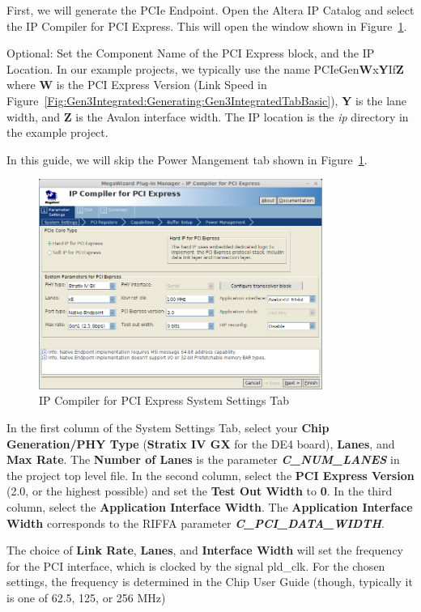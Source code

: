 \documentclass{refrep}
\newcommand{\Directory}[1]{\textit{#1}}
\newcommand{\ConfigSetting}[1]{\textbf{#1}}
\newcommand{\RIFFAParameter}[1]{\textit{\textbf{#1}}}
\begin{document}
First, we will generate the PCIe Endpoint. Open the Altera IP Catalog and select
the IP Compiler for PCI Express. This will open the window shown in
Figure~\ref{Fig:Altera:IPCompiler:PCIeSystemSettingsTab}.

Optional: Set the Component Name of the PCI Express block, and the IP
Location. In our example projects, we typically use the name
PCIeGen\ConfigSetting{W}x\ConfigSetting{Y}If\ConfigSetting{Z} where \ConfigSetting{W} is the PCI Express
Version (Link Speed in
Figure~\ref{Fig:Gen3Integrated:Generating:Gen3IntegratedTabBasic}), \ConfigSetting{Y}
is the lane width, and \ConfigSetting{Z} is the Avalon interface width. The IP location
is the \Directory{ip} directory in the example project.

In this guide, we will skip the Power Mangement tab shown in
Figure~\ref{Fig:Altera:IPCompiler:PCIeSystemSettingsTab}.
\begin{figure}[H]
  \includegraphics[width=350px,center]{IPCompilerPCIeTabSystemSettings.png}
  \caption{IP Compiler for PCI Express System Settings Tab}
  \label{Fig:Altera:IPCompiler:PCIeSystemSettingsTab}
\end{figure}
In the first column of the System Settings Tab, select your \ConfigSetting{Chip
  Generation/PHY Type} (\ConfigSetting{Stratix IV GX} for the DE4 board),
\ConfigSetting{Lanes}, and \ConfigSetting{Max Rate}. The \ConfigSetting{Number
  of Lanes} is the parameter \RIFFAParameter{C\_NUM\_LANES} in the project top
level file. In the second column, select the \ConfigSetting{PCI Express Version}
(2.0, or the highest possible) and set the \ConfigSetting{Test Out Width} to
\ConfigSetting{0}. In the third column, select the \ConfigSetting{Application Interface
  Width}. The \ConfigSetting{Application Interface Width} corresponds to the RIFFA parameter
\RIFFAParameter{C\_PCI\_DATA\_WIDTH}.

The choice of \ConfigSetting{Link Rate}, \ConfigSetting{Lanes}, and
\ConfigSetting{Interface Width} will set the frequency for the PCI interface,
which is clocked by the signal pld\_clk. For the chosen settings, the frequency
is determined in the Chip User Guide (though, typically it is one of 62.5, 125,
or 256 MHz)
\end{document}
